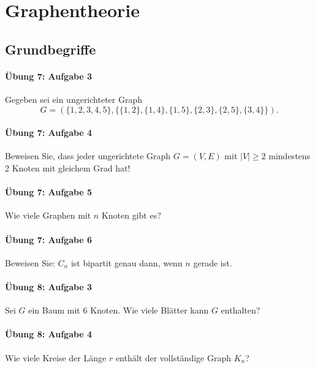 \documentclass
[
  draft    = true,
  fontsize = 11pt,
  parskip  = half-,
  BCOR     = 0pt,
  DIV      = 11,
  ngerman,
  dvipsnames
]
{scrartcl}
\begin{document}
\section{Graphentheorie}

\subsection{Grundbegriffe}

\paragraph{Übung 7: Aufgabe 3}
Gegeben sei ein ungerichteter Graph
\begin{equation*}
  G=(\{1,2,3,4,5\},\{\{1,2\},\{1,4\},\{1,5\},\{2,3\},\{2,5\},\{3,4\}\}).
\end{equation*}

\paragraph{Übung 7: Aufgabe 4}
Beweisen Sie, dass jeder ungerichtete Graph $G=(V,E)$ mit $|V|\geq2$
mindestens 2 Knoten mit gleichem Grad hat!

\paragraph{Übung 7: Aufgabe 5}
Wie viele Graphen mit $n$ Knoten gibt es?

\paragraph{Übung 7: Aufgabe 6}
Beweisen Sie: $C_n$ ist bipartit genau dann, wenn $n$ gerade ist.

\paragraph{Übung 8: Aufgabe 3}
Sei $G$ ein Baum mit 6 Knoten. Wie viele Blätter kann $G$ enthalten?

\paragraph{Übung 8: Aufgabe 4}
Wie viele Kreise der Länge $r$ enthält der vollständige Graph $K_n$?
\end{document}
